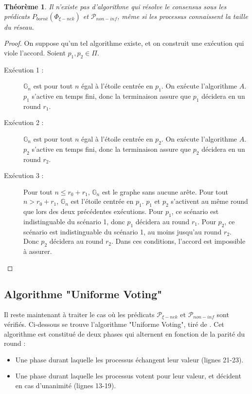 \documentclass{article}
\newtheorem{theorem}{Théorème}
\begin{document}
\begin{theorem}
	Il n'existe pas d'algorithme qui résolve le consensus sous les prédicats $P_{borné}(\Phi_{\xi-nek})$ et $\mathcal{P}_{non-inf}$, même si les processus connaissent la taille du réseau.
\end{theorem}
\begin{proof}
	On suppose qu'un tel algorithme existe, et on construit une exécution qui viole l'accord.
	Soient $p_1, p_2 \in \Pi$.
	\begin{description}

		\item[Exécution 1 :] $\mathds{G}_n$ est pour tout $n$ égal à l'étoile centrée en $p_1$. On exécute l'algorithme $A$.
			$p_1$ s'active en temps fini, donc la terminaison assure que $p_1$ décidera en un round $r_1$.
		\item[Exécution 2 :] $\mathds{G}_n$ est pour tout $n$ égal à l'étoile centrée en $p_2$. On exécute l'algorithme $A$.
			$p_2$ s'active en temps fini, donc la terminaison assure que $p_2$ décidera en un round $r_2$.
		\item[Exécution 3 :] Pour tout $n \leq r_0 + r_1$, $\mathds{G}_n$ est le graphe sans aucune arête. Pour tout $n > r_0 + r_1$, $\mathds{G}_n$ est l'étoile centrée en $p_1$.
			$p_1$ et $p_2$ s'activent au même round que lors des deux précédentes exécutions.
			Pour $p_1$, ce scénario est indistinguable du scénario 1, donc $p_1$ décidera au round $r_1$.
			Pour $p_2$, ce scénario est indistinguable du scénario 1, au moins jusqu'au round $r_2$. Donc $p_2$ décidera au round $r_2$.
			Dans ces conditions, l'accord est impossible à assurer.

	\end{description}
\end{proof}

\subsection{Algorithme "Uniforme Voting"}

Il reste maintenant à traiter le cas où les prédicats $\mathcal{P}_{\xi-nek}$ et $\mathcal{P}_{non-inf}$ sont vérifiés.
Ci-dessous se trouve l'algorithme "Uniforme Voting", tiré de \cite{model_ho}.
Cet algorithme est constitué de deux phases qui alternent en fonction de la parité du round :
\begin{itemize}
	\item Une phase durant laquelle les processus échangent leur valeur (lignes 21-23).
	\item Une phase durant laquelle les processus votent pour leur valeur, et décident en cas d'unanimité (lignes 13-19).
\end{itemize}
\end{document}
